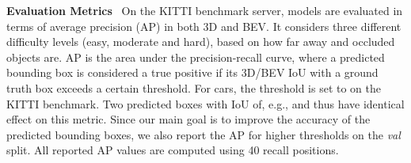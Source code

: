 \documentclass[letterpaper, 10 pt, conference]{ieeeconf}
\newcommand{\parsection}[1]{\vspace{2mm}\noindent\textbf{#1}~ }
\begin{document}
\parsection{Evaluation Metrics}
On the KITTI benchmark server, models are evaluated in terms of average precision (AP) in both 3D and BEV. It considers three different difficulty levels (easy, moderate and hard), based on how far away and occluded objects are. AP is the area under the precision-recall curve, where a predicted bounding box is considered a true positive if its 3D/BEV IoU with a ground truth box exceeds a certain threshold. For cars, the threshold is set to  on the KITTI benchmark. Two predicted boxes with IoU of, e.g.,  and  thus have identical effect on this metric. Since our main goal is to improve the accuracy of the predicted bounding boxes, we also report the AP for higher thresholds  on the \textit{val} split. All reported AP values are computed using 40 recall positions. 




















\begin{table}[t]
\centering
\caption{Results on KITTI val in terms of 3D and BEV AP.}\vspace{-2.0mm}
\label{tab:kitti_val}
\vspace{-3.0mm}
\end{table}
\end{document}
